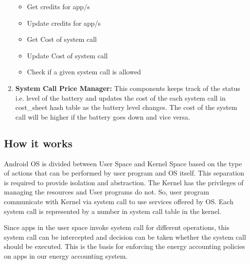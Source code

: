 \begin{enumerate}
	\begin{itemize}
		\item Get credits for app/s
		\item Update credits for app/s
		\item Get Cost of system call
		\item Update Cost of system call
		\item Check if a given system call is allowed
	\end{itemize}
	
	\item \textbf{System Call Price Manager:}
	This components keeps track of the status i.e. level of the battery and updates the cost of the each system call in cost\_sheet hash table as the battery level changes. The cost of the system call will be higher if the battery goes down and vice versa.
	
\end{enumerate}



\subsection{How it works}
Android OS is divided between User Space and Kernel Space based on the type of actions that can be performed by user program and OS itself. This separation is required to provide isolation and abstraction. The Kernel has the privileges of managing the resources and User programs do not.
So, user program communicate with Kernel via system call to use services offered by OS. Each system call is represented by a number in system call table in the kernel. 

Since apps in the user space invoke system call for different operations, this system call can be intercepted and decision can be taken whether the system call should be executed. This is the basis for enforcing the energy accounting policies on apps in our energy accounting system. 

